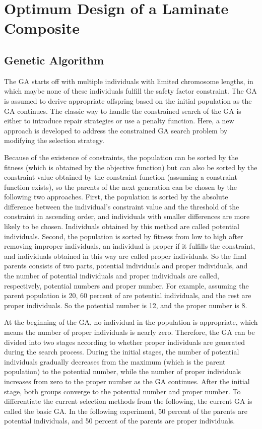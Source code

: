 \documentclass[USenglish,twocolumn]{article}
\begin{document}
\section{Optimum Design of a Laminate Composite}

\subsection{Genetic Algorithm}
The GA starts off with multiple individuals with limited chromosome lengths, in which maybe none of
these individuals fulfill the safety factor constraint. The GA is assumed to derive appropriate
offspring based on the initial population as the GA continues. The classic way to handle the constrained
search of the GA is either to introduce repair strategies or use a penalty function. Here, a new
approach is developed to address the constrained GA search problem by modifying the selection
strategy.

Because of the existence of constraints, the population can be sorted by the
fitness (which is obtained by the objective function) but can also be sorted by the constraint value
obtained by the constraint function (assuming a constraint function exists), so the parents of the next
generation can be chosen by the following two approaches. First, the population is sorted by the
absolute difference between the individual's constraint value and the threshold of the constraint in
ascending order, and individuals with smaller differences are more likely to be chosen. Individuals
obtained by this method are called potential individuals. Second, the population is sorted by fitness
from low to high after removing improper individuals, an individual is proper if it
fulfills the constraint, and individuals obtained in this way are called proper individuals. So the
final parents consists of two parts, potential individuals and proper individuals, and the number of
potential individuals and proper individuals are called, respectively, potential numbers and proper
number. For example, assuming the parent population is 20, 60 percent of are potential
individuals, and the rest are proper individuals. So the potential number is 12, and the proper
number is 8.

At the beginning of the GA, no individual in the population is appropriate, which means the number
of proper individuals is nearly zero. Therefore, the GA can be divided into two stages according to whether
proper individuals are generated during the search process. During the initial stages, the number of
potential individuals gradually decreases from the maximum (which is the parent population) to the potential
number, while the number of proper individuals increases from zero to the proper number as the GA
continues. After the initial stage, both groups converge to the
potential number and proper number. To differentiate the current selection methods from
the following, the current GA is called the basic GA. In the following experiment, 50 percent of the
parents are potential individuals, and 50 percent of the parents are proper individuals.
\end{document}
